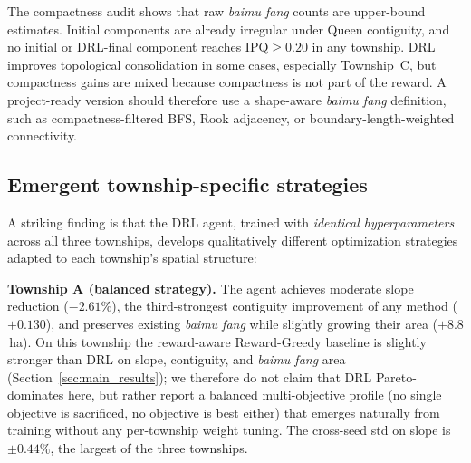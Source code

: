 \documentclass[preprint,12pt]{elsarticle}
\begin{document}


The compactness audit shows that raw \textit{baimu fang} counts are upper-bound estimates. Initial components are already irregular under Queen contiguity, and no initial or DRL-final component reaches $\mathrm{IPQ}\geq0.20$ in any township. DRL improves topological consolidation in some cases, especially Township~C, but compactness gains are mixed because compactness is not part of the reward. A project-ready version should therefore use a shape-aware \textit{baimu fang} definition, such as compactness-filtered BFS, Rook adjacency, or boundary-length-weighted connectivity.

\subsection{Emergent township-specific strategies}
\label{sec:strategies}

A striking finding is that the DRL agent, trained with \textit{identical hyperparameters} across all three townships, develops qualitatively different optimization strategies adapted to each township's spatial structure:

\textbf{Township A (balanced strategy).} The agent achieves moderate slope reduction ($-2.61\%$), the third-strongest contiguity improvement of any method ($+0.130$), and preserves existing \textit{baimu fang} while slightly growing their area ($+8.8$\,ha). On this township the reward-aware Reward-Greedy baseline is slightly stronger than DRL on slope, contiguity, and \textit{baimu fang} area (Section~\ref{sec:main_results}); we therefore do not claim that DRL Pareto-dominates here, but rather report a balanced multi-objective profile (no single objective is sacrificed, no objective is best either) that emerges naturally from training without any per-township weight tuning. The cross-seed std on slope is $\pm0.44\%$, the largest of the three townships.
\end{document}
